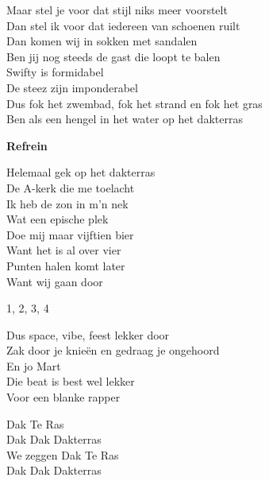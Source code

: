 Maar stel je voor dat stijl niks meer voorstelt\\
Dan stel ik voor dat iedereen van schoenen ruilt\\
Dan komen wij in sokken met sandalen\\
Ben jij nog steeds de gast die loopt te balen\\
Swifty is formidabel\\
De steez zijn imponderabel\\
Dus fok het zwembad, fok het strand en fok het gras\\
Ben als een hengel in het water op het dakterras

\textbf{Refrein}

Helemaal gek op het dakterras\\
De A-kerk die me toelacht\\
Ik heb de zon in m'n nek\\
Wat een epische plek\\
Doe mij maar vijftien bier\\
Want het is al over vier\\
Punten halen komt later\\
Want wij gaan door

1, 2, 3, 4

Dus space, vibe, feest lekker door\\
Zak door je knieën en gedraag je ongehoord\\
En jo Mart\\
Die beat is best wel lekker\\
Voor een blanke rapper

Dak Te Ras\\
Dak Dak Dakterras\\
We zeggen Dak Te Ras\\
Dak Dak Dakterras
